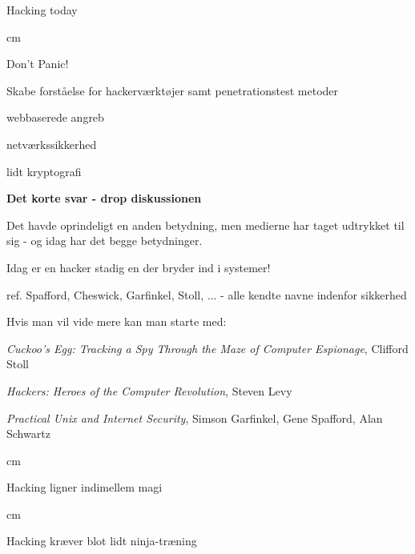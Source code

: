 \documentclass[20pt,landscape,a4paper]{foils}
\begin{document}

\mytitlepage
{Hacking today}{}



 cm

\centerline{\color{titlecolor}\LARGE Don't Panic!}

\begin{list1}
\item Skabe forståelse for hackerværktøjer
  samt penetrationstest metoder

\item webbaserede angreb
\item netværkssikkerhed
\item lidt kryptografi

\end{list1}



{\bfseries Det korte svar - drop diskussionen}

Det havde oprindeligt en anden betydning, men medierne har taget
udtrykket til sig - og idag har det begge betydninger.

{\color{red}\hlkbig Idag er en hacker stadig en der bryder ind i systemer!}

ref. Spafford, Cheswick, Garfinkel, Stoll, ...
- alle kendte navne indenfor sikkerhed

Hvis man vil vide mere kan man starte med:
\begin{list2}
\item \emph{Cuckoo's Egg: Tracking a Spy Through the Maze of Computer
 Espionage},  Clifford Stoll
\item \emph{Hackers: Heroes of the Computer Revolution},
Steven Levy
\item \emph{Practical Unix and Internet Security},
Simson Garfinkel, Gene Spafford, Alan Schwartz
\end{list2}





 cm

\centerline{Hacking ligner indimellem  magi}




 cm
\centerline{Hacking kræver blot lidt ninja-træning}
\end{document}
